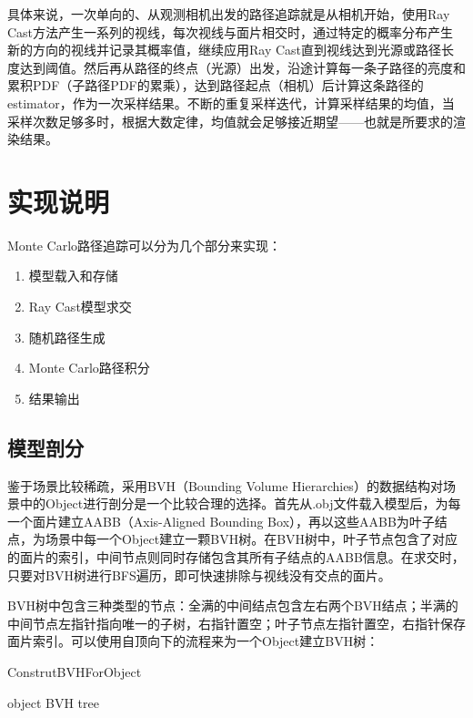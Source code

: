 \documentclass[10pt,a4paper]{article}
\begin{document}
具体来说，一次单向的、从观测相机出发的路径追踪就是从相机开始，使用Ray Cast方法产生一系列的视线，每次视线与面片相交时，通过特定的概率分布产生新的方向的视线并记录其概率值，继续应用Ray Cast直到视线达到光源或路径长度达到阈值。然后再从路径的终点（光源）出发，沿途计算每一条子路径的亮度和累积PDF（子路径PDF的累乘），达到路径起点（相机）后计算这条路径的estimator，作为一次采样结果。不断的重复采样迭代，计算采样结果的均值，当采样次数足够多时，根据大数定律，均值就会足够接近期望——也就是所要求的渲染结果。

\newpage
\section{实现说明}
Monte Carlo路径追踪可以分为几个部分来实现：
\begin{enumerate}\small
  \item 模型载入和存储
  \item Ray Cast模型求交
  \item 随机路径生成
  \item Monte Carlo路径积分
  \item 结果输出
\end{enumerate}

\subsection{模型剖分}
鉴于场景比较稀疏，采用BVH（Bounding Volume Hierarchies）的数据结构对场景中的Object进行剖分是一个比较合理的选择。首先从.obj文件载入模型后，为每一个面片建立AABB（Axis-Aligned Bounding Box），再以这些AABB为叶子结点，为场景中每一个Object建立一颗BVH树。在BVH树中，叶子节点包含了对应的面片的索引，中间节点则同时存储包含其所有子结点的AABB信息。在求交时，只要对BVH树进行BFS遍历，即可快速排除与视线没有交点的面片。

BVH树中包含三种类型的节点：全满的中间结点包含左右两个BVH结点；半满的中间节点左指针指向唯一的子树，右指针置空；叶子节点左指针置空，右指针保存面片索引。可以使用自顶向下的流程来为一个Object建立BVH树：
\begin{algorithm}
  \caption{ConstrutBVHForObject}
  \begin{algorithmic}
    \REQUIRE object
    \ENSURE BVH tree
    \ENDFOR
      \ENDFOR
    \ENDWHILE
  \end{algorithmic}
\end{algorithm}
\end{document}
